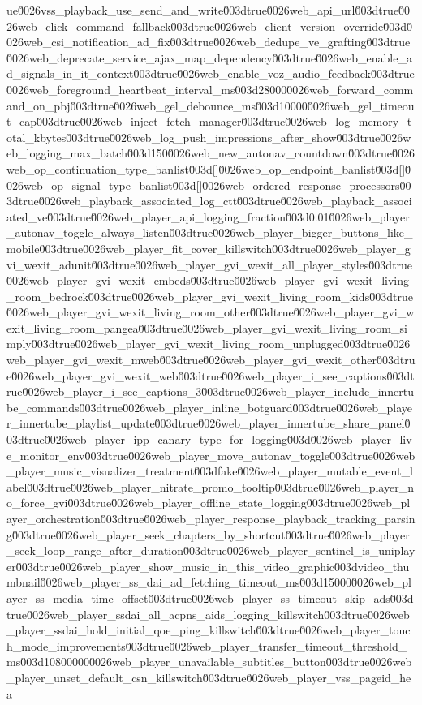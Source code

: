 {ue\u0026vss_playback_use_send_and_write\u003dtrue\u0026web_api_url\u003dtrue\u0026web_click_command_fallback\u003dtrue\u0026web_client_version_override\u003d\u0026web_csi_notification_ad_fix\u003dtrue\u0026web_dedupe_ve_grafting\u003dtrue\u0026web_deprecate_service_ajax_map_dependency\u003dtrue\u0026web_enable_ad_signals_in_it_context\u003dtrue\u0026web_enable_voz_audio_feedback\u003dtrue\u0026web_foreground_heartbeat_interval_ms\u003d28000\u0026web_forward_command_on_pbj\u003dtrue\u0026web_gel_debounce_ms\u003d10000\u0026web_gel_timeout_cap\u003dtrue\u0026web_inject_fetch_manager\u003dtrue\u0026web_log_memory_total_kbytes\u003dtrue\u0026web_log_push_impressions_after_show\u003dtrue\u0026web_logging_max_batch\u003d150\u0026web_new_autonav_countdown\u003dtrue\u0026web_op_continuation_type_banlist\u003d[]\u0026web_op_endpoint_banlist\u003d[]\u0026web_op_signal_type_banlist\u003d[]\u0026web_ordered_response_processors\u003dtrue\u0026web_playback_associated_log_ctt\u003dtrue\u0026web_playback_associated_ve\u003dtrue\u0026web_player_api_logging_fraction\u003d0.01\u0026web_player_autonav_toggle_always_listen\u003dtrue\u0026web_player_bigger_buttons_like_mobile\u003dtrue\u0026web_player_fit_cover_killswitch\u003dtrue\u0026web_player_gvi_wexit_adunit\u003dtrue\u0026web_player_gvi_wexit_all_player_styles\u003dtrue\u0026web_player_gvi_wexit_embeds\u003dtrue\u0026web_player_gvi_wexit_living_room_bedrock\u003dtrue\u0026web_player_gvi_wexit_living_room_kids\u003dtrue\u0026web_player_gvi_wexit_living_room_other\u003dtrue\u0026web_player_gvi_wexit_living_room_pangea\u003dtrue\u0026web_player_gvi_wexit_living_room_simply\u003dtrue\u0026web_player_gvi_wexit_living_room_unplugged\u003dtrue\u0026web_player_gvi_wexit_mweb\u003dtrue\u0026web_player_gvi_wexit_other\u003dtrue\u0026web_player_gvi_wexit_web\u003dtrue\u0026web_player_i_see_captions\u003dtrue\u0026web_player_i_see_captions_3\u003dtrue\u0026web_player_include_innertube_commands\u003dtrue\u0026web_player_inline_botguard\u003dtrue\u0026web_player_innertube_playlist_update\u003dtrue\u0026web_player_innertube_share_panel\u003dtrue\u0026web_player_ipp_canary_type_for_logging\u003d\u0026web_player_live_monitor_env\u003dtrue\u0026web_player_move_autonav_toggle\u003dtrue\u0026web_player_music_visualizer_treatment\u003dfake\u0026web_player_mutable_event_label\u003dtrue\u0026web_player_nitrate_promo_tooltip\u003dtrue\u0026web_player_no_force_gvi\u003dtrue\u0026web_player_offline_state_logging\u003dtrue\u0026web_player_orchestration\u003dtrue\u0026web_player_response_playback_tracking_parsing\u003dtrue\u0026web_player_seek_chapters_by_shortcut\u003dtrue\u0026web_player_seek_loop_range_after_duration\u003dtrue\u0026web_player_sentinel_is_uniplayer\u003dtrue\u0026web_player_show_music_in_this_video_graphic\u003dvideo_thumbnail\u0026web_player_ss_dai_ad_fetching_timeout_ms\u003d15000\u0026web_player_ss_media_time_offset\u003dtrue\u0026web_player_ss_timeout_skip_ads\u003dtrue\u0026web_player_ssdai_all_acpns_aids_logging_killswitch\u003dtrue\u0026web_player_ssdai_hold_initial_qoe_ping_killswitch\u003dtrue\u0026web_player_touch_mode_improvements\u003dtrue\u0026web_player_transfer_timeout_threshold_ms\u003d10800000\u0026web_player_unavailable_subtitles_button\u003dtrue\u0026web_player_unset_default_csn_killswitch\u003dtrue\u0026web_player_vss_pageid_hea}
